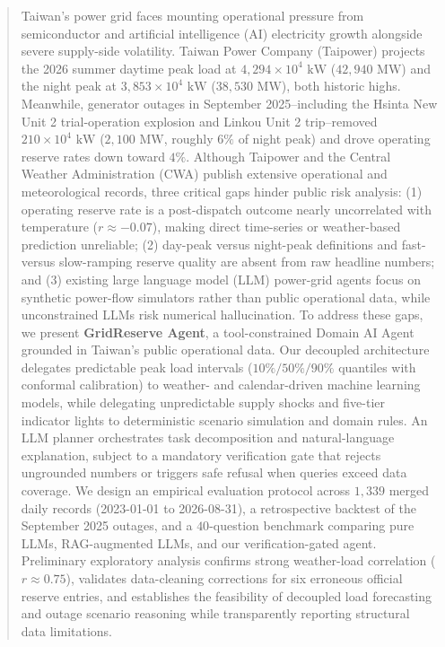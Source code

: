 \documentclass[conference]{IEEEtran}
\begin{document}
\begin{abstract}
Taiwan's power grid faces mounting operational pressure from semiconductor and artificial intelligence (AI) electricity growth alongside severe supply-side volatility. Taiwan Power Company (Taipower) projects the 2026 summer daytime peak load at $4{,}294 \times 10^4\text{ kW}$ ($42{,}940\text{ MW}$) and the night peak at $3{,}853 \times 10^4\text{ kW}$ ($38{,}530\text{ MW}$), both historic highs. Meanwhile, generator outages in September 2025--including the Hsinta New Unit 2 trial-operation explosion and Linkou Unit 2 trip--removed $210 \times 10^4\text{ kW}$ ($2{,}100\text{ MW}$, roughly $6\%$ of night peak) and drove operating reserve rates down toward $4\%$. Although Taipower and the Central Weather Administration (CWA) publish extensive operational and meteorological records, three critical gaps hinder public risk analysis: (1) operating reserve rate is a post-dispatch outcome nearly uncorrelated with temperature ($r \approx -0.07$), making direct time-series or weather-based prediction unreliable; (2) day-peak versus night-peak definitions and fast- versus slow-ramping reserve quality are absent from raw headline numbers; and (3) existing large language model (LLM) power-grid agents focus on synthetic power-flow simulators rather than public operational data, while unconstrained LLMs risk numerical hallucination. To address these gaps, we present \textbf{GridReserve Agent}, a tool-constrained Domain AI Agent grounded in Taiwan's public operational data. Our decoupled architecture delegates predictable peak load intervals ($10\%/50\%/90\%$ quantiles with conformal calibration) to weather- and calendar-driven machine learning models, while delegating unpredictable supply shocks and five-tier indicator lights to deterministic scenario simulation and domain rules. An LLM planner orchestrates task decomposition and natural-language explanation, subject to a mandatory verification gate that rejects ungrounded numbers or triggers safe refusal when queries exceed data coverage. We design an empirical evaluation protocol across $1{,}339$ merged daily records (2023-01-01 to 2026-08-31), a retrospective backtest of the September 2025 outages, and a $40$-question benchmark comparing pure LLMs, RAG-augmented LLMs, and our verification-gated agent. Preliminary exploratory analysis confirms strong weather-load correlation ($r \approx 0.75$), validates data-cleaning corrections for six erroneous official reserve entries, and establishes the feasibility of decoupled load forecasting and outage scenario reasoning while transparently reporting structural data limitations.
\end{abstract}
\end{document}
